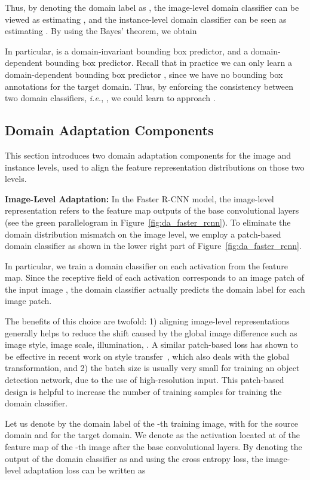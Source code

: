\documentclass[10pt,twocolumn,letterpaper]{article}
\def\ie{\emph{i.e.}}
\begin{document}
Thus, by denoting the domain label as , the image-level domain classifier can be viewed as estimating , and the instance-level domain classifier can be seen as estimating .  By using the Bayes' theorem, we obtain

In particular,  is a domain-invariant bounding box predictor, and  a domain-dependent bounding box predictor. Recall that in practice we can only learn a domain-dependent bounding box predictor , since we have no bounding box annotations for the target domain. Thus, by enforcing the consistency between two domain classifiers, \ie,  , we could learn  to approach .

\subsection{Domain Adaptation Components}
\label{sec:da_faster_rcnn}
This section introduces two domain adaptation components for the image and instance levels, used to align the feature representation distributions on those two levels. 

\textbf{Image-Level Adaptation: } In the Faster R-CNN model, the image-level representation refers to the feature map outputs of the base convolutional layers (see the green parallelogram in Figure~\ref{fig:da_faster_rcnn}). To eliminate the domain distribution mismatch on the image level, we employ a patch-based domain classifier as shown in the lower right part of Figure~\ref{fig:da_faster_rcnn}. 

In particular, we train a domain classifier on each activation from the feature map.  Since the receptive field of each activation corresponds to an image patch of the input image , the domain classifier actually predicts the domain label for each image patch.

The benefits of this choice are twofold: 1)  aligning image-level representations generally helps to reduce the shift caused by the global image difference such as image style, image scale, illumination, \etc. 
A similar patch-based loss has shown to be effective in recent work on style transfer~\cite{johnson2016perceptual}, which also deals with the global transformation, and 2) the batch size is usually very small for training an object detection network, due to the use of high-resolution input. This patch-based design is helpful to increase the number of training samples for training the domain classifier. 

Let us denote by  the domain label of the -th training image, with  for the source domain and  for the target domain. We denote as  the activation located at  of the feature map of the -th image after the base convolutional layers. By denoting the output of the domain classifier as  and using the cross entropy loss, the image-level adaptation loss can be written as
\end{document}
